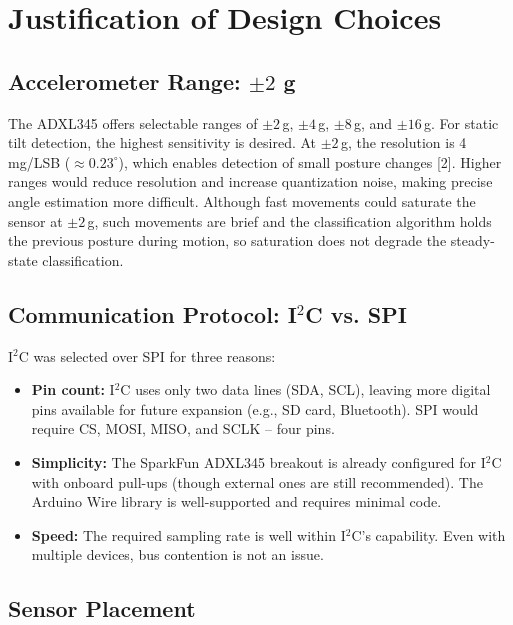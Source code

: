 \documentclass[conference]{IEEEtran}
\begin{document}
\section{Justification of Design Choices}

\subsection{Accelerometer Range: $\pm 2$ g}

The ADXL345 offers selectable ranges of $\pm2$\,g, $\pm4$\,g, $\pm8$\,g, and $\pm16$\,g. For static tilt 
detection, the highest sensitivity is desired. At $\pm2$\,g, the resolution is 4\,mg/LSB ($\approx 0.23^\circ$), 
which enables detection of small posture changes [2]. Higher ranges would reduce 
resolution and increase quantization noise, making precise angle estimation more difficult. 
Although fast movements could saturate the sensor at $\pm2$\,g, such movements are brief 
and the classification algorithm holds the previous posture during motion, so saturation 
does not degrade the steady-state classification.

\subsection{Communication Protocol: I$^2$C vs. SPI}

I$^2$C was selected over SPI for three reasons:

\begin{itemize}[leftmargin=*,noitemsep]
    \item \textbf{Pin count:} I$^2$C uses only two data lines (SDA, SCL), leaving more digital pins 
    available for future expansion (e.g., SD card, Bluetooth). SPI would require CS, 
    MOSI, MISO, and SCLK -- four pins.

    \item \textbf{Simplicity:} The SparkFun ADXL345 breakout is already configured for I$^2$C with 
    onboard pull-ups (though external ones are still recommended). The Arduino 
    Wire library is well-supported and requires minimal code.

    \item \textbf{Speed:} The required sampling rate is well within I$^2$C's capability. Even with 
    multiple devices, bus contention is not an issue.
\end{itemize}

\subsection{Sensor Placement}
\end{document}
